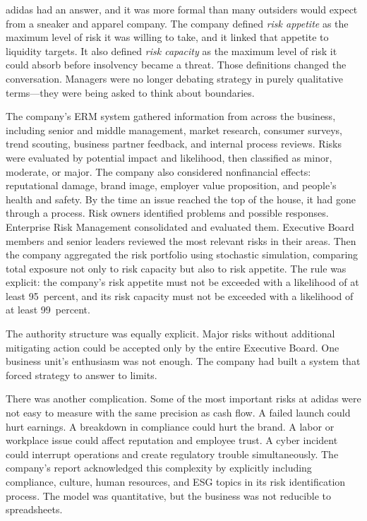 \documentclass[11pt,openany]{book}
\begin{document}
\begin{corporateexample}
adidas had an answer, and it was more formal than many outsiders would expect
from a sneaker and apparel company. The company defined \emph{risk appetite} as
the maximum level of risk it was willing to take, and it linked that appetite to
liquidity targets. It also defined \emph{risk capacity} as the maximum level of
risk it could absorb before insolvency became a threat. Those definitions
changed the conversation. Managers were no longer debating strategy in purely
qualitative terms---they were being asked to think about boundaries.

The company's ERM system gathered information from across the business,
including senior and middle management, market research, consumer surveys, trend
scouting, business partner feedback, and internal process reviews. Risks were
evaluated by potential impact and likelihood, then classified as minor,
moderate, or major. The company also considered nonfinancial effects:
reputational damage, brand image, employer value proposition, and people's
health and safety. By the time an issue reached the top of the house, it had
gone through a process. Risk owners identified problems and possible responses.
Enterprise Risk Management consolidated and evaluated them. Executive Board
members and senior leaders reviewed the most relevant risks in their areas.
Then the company aggregated the risk portfolio using stochastic simulation,
comparing total exposure not only to risk capacity but also to risk appetite.
The rule was explicit: the company's risk appetite must not be exceeded with a
likelihood of at least 95~percent, and its risk capacity must not be exceeded
with a likelihood of at least 99~percent.

The authority structure was equally explicit. Major risks without additional
mitigating action could be accepted only by the entire Executive Board. One
business unit's enthusiasm was not enough. The company had built a system that
forced strategy to answer to limits.

There was another complication. Some of the most important risks at adidas were
not easy to measure with the same precision as cash flow. A failed launch could
hurt earnings. A breakdown in compliance could hurt the brand. A labor or
workplace issue could affect reputation and employee trust. A cyber incident
could interrupt operations and create regulatory trouble simultaneously. The
company's report acknowledged this complexity by explicitly including
compliance, culture, human resources, and ESG topics in its risk identification
process. The model was quantitative, but the business was not reducible to
spreadsheets.


\end{corporateexample}
\end{document}
